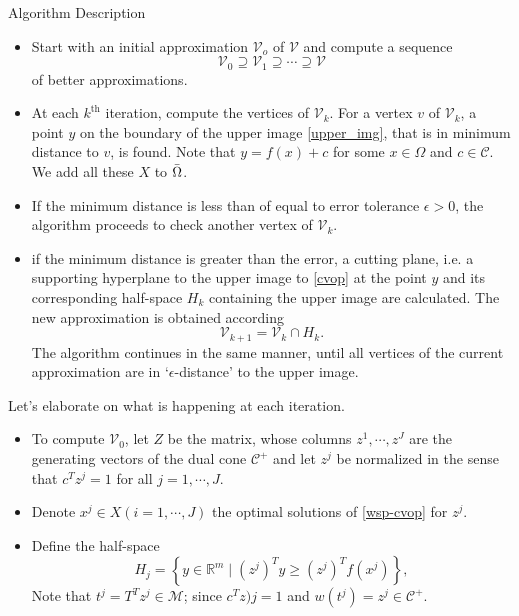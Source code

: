 \documentclass[10pt,xcolor={table,dvipsnames},t,unknownkeysallowed]{beamer}
\newcommand{\R}{\mathbb{R}}
\newcommand{\cone}[1]{\mathcal{#1}}
\begin{document}
\begin{frame}{Algorithm Description}
\begin{itemize}
    \item Start with an initial approximation $\cone{V}_o$ of $\cone{V}$ and compute a sequence 
    \[
    \cone{V}_0\supseteq \cone{V}_1\supseteq \cdots \supseteq \cone{V}
    \]
    of better approximations.
    \item At each $k^{\text{th}}$ iteration, compute the vertices of $\cone{V}_k$. For a vertex $v$ of $\cone{V}_k$, a point $y$ on the boundary of the upper image \eqref{upper_img}, that is in minimum distance to $v$, is found. Note that $y=f(x)+c$ for some $x\in \Omega$ and $c\in \cone{C}$.
    We add all these $X$ to $\Bar{\Omega}$.
    \item If the minimum distance is less than of equal to error tolerance $\epsilon>0$, the algorithm proceeds to check another vertex of $\cone{V}_k$.
    
\end{itemize}
    
\end{frame}
\begin{frame}{}
    \begin{itemize}
    \item if the minimum distance is greater than the error, a cutting plane, i.e. a supporting hyperplane to the upper image to \eqref{cvop} at the point $y$ and its corresponding half-space $H_k$ containing the upper image are calculated. The new approximation is obtained according
    \[
    \cone{V}_{k+1}=\cone{V}_k\cap H_k.
    \]
    The algorithm continues in the same manner, until all vertices of the current approximation are in ‘$\epsilon$-distance’ to the upper image.
    \end{itemize}
    Let's elaborate on what is happening at each iteration. 
    \begin{itemize}
        \item To compute $\cone{V}_0$, let $Z$  be the matrix, whose columns $z^1,\cdots,z^J$ are the generating vectors of the dual cone $\cone{C}^+$ and let $z^j$ be normalized in the sense that $c^Tz^j = 1$ for all $j = 1,\cdots, J$.
        \item Denote $x^j \in X (i = 1,\cdots, J )$ the optimal solutions of \eqref{wsp-cvop} for $z^j$.
        \item Define the half-space
        \[
          H_j=\left\{y\in \R^m\;|\; (z^j)^Ty\geq (z^j)^Tf(x^j) \right\},
        \]
        Note that $t^j=T^Tz^j \in \cone{M}$; since $c^Tz)j=1$ and $w(t^j)=z^j\in \cone{C}^+$.
    \end{itemize}
\end{frame}
\end{document}
